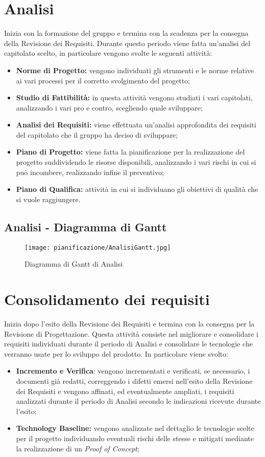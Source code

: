 \documentclass[../PianodiProgetto.tex]{subfiles}
\begin{document}
	\section{Analisi}
	Inizia con la formazione del gruppo e termina con la scadenza per la consegna della Revisione dei Requisiti.
	Durante questo periodo viene fatta un'analisi del capitolato scelto, in particolare vengono svolte le seguenti attività:
	\begin{itemize}
		\item \textbf{Norme di Progetto:} vengono individuati gli strumenti e le norme relative ai vari processi per il corretto svolgimento del progetto;
		\item \textbf{Studio di Fattibilità:} in questa attività vengono studiati i vari capitolati, analizzando i vari pro e contro, scegliendo quale sviluppare;
		\item \textbf{Analisi dei Requisiti:} viene effettuata un'analisi approfondita dei requisiti del capitolato che il gruppo ha deciso di sviluppare;
		\item \textbf{Piano di Progetto:} viene fatta la pianificazione per la realizzazione del progetto suddividendo le risorse disponibili, analizzando i vari rischi in cui si può incombere, realizzando infine il preventivo; 
		\item \textbf{Piano di Qualifica:} attività in cui si individuano gli obiettivi di qualità che si vuole raggiungere.	
	\end{itemize}
	
	\subsection{Analisi - Diagramma di Gantt}
	\begin{figure}[H]
		\texttt{[image: pianificazione/AnalisiGantt.jpg]}	
		\caption{Diagramma di Gantt di Analisi}\label{fig:1}	
	\end{figure}
	\newpage
	\section{Consolidamento dei requisiti} Inizia dopo l'esito della Revisione dei Requisiti e termina con la consegna per la Revisione di Progettazione. Questa attività consiste nel migliorare e consolidare i requisiti individuati durante il periodo di Analisi e consolidare le tecnologie che verranno usate per lo sviluppo del prodotto. In particolare viene svolto:

	\begin{itemize}	
		\item \textbf{Incremento e Verifica}: vengono incrementati e verificati, se necessario, i documenti già redatti, correggendo i difetti emersi nell'esito della Revisione dei Requisiti e vengono affinati, ed eventualmente ampliati, i requisiti analizzati durante il periodo di Analisi secondo le indicazioni ricevute durante l'esito;
		\item \textbf{Technology Baseline:} vengono analizzate nel dettaglio le tecnologie scelte per il progetto individuando eventuali rischi delle stesse e mitigati mediante la realizzazione di un \textit{Proof of Concept};
	\end{itemize}
\end{document}
